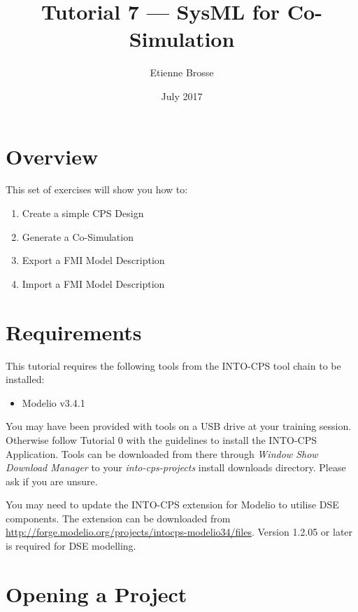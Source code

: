 \documentclass[11pt,a4paper]{../tutorial}
\title{Tutorial 7 --- SysML for Co-Simulation}
\date{July 2017}
\author{Etienne Brosse}
\begin{document}
\section*{Overview}

This set of exercises will show you how to:

\begin{enumerate}[noitemsep]
\item Create a simple CPS Design
\item Generate a Co-Simulation
\item Export a FMI Model Description
\item Import a FMI Model Description

\end{enumerate}

\section*{Requirements}

This tutorial requires the following tools from the INTO-CPS tool chain to be installed:

\begin{itemize}[noitemsep]
\item Modelio v3.4.1
\end{itemize}

You may have been provided with tools on a USB drive at your training session. Otherwise follow Tutorial 0 with the guidelines to install the INTO-CPS Application. Tools can be downloaded from there through \emph{Window \menusep Show Download Manager} to your \emph{into-cps-projects} install downloads directory. Please ask if you are unsure.

\vspace{4mm}

You may need to update the INTO-CPS extension for Modelio to utilise DSE components. The extension can be downloaded from \mbox{\url{http://forge.modelio.org/projects/intocps-modelio34/files}}. Version 1.2.05 or later is required for DSE modelling.

\newpage

\section{Opening a Project}
\end{document}
